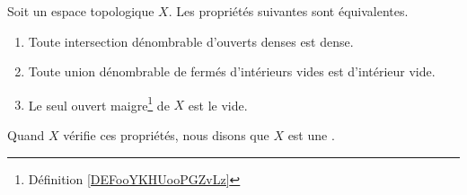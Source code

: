 \begin{propositionDef}	 \label{DEFooYEMNooLSXLYa}
	Soit un espace topologique \( X\). Les propriétés suivantes sont équivalentes.
	\begin{enumerate}
		\item		\label{ITEMooBHOOooKyToBw}
		      Toute intersection dénombrable d'ouverts denses est dense.
		\item		\label{ITEMooFMDAooUPaULP}
		      Toute union dénombrable de fermés d'intérieurs vides est d'intérieur vide.
		\item		\label{ITEMooKSNYooIgzLey}
		      Le seul ouvert maigre\footnote{Définition \ref{DEFooYKHUooPGZvLz}} de \( X\) est le vide.
	\end{enumerate}
	Quand \( X\) vérifie ces propriétés, nous disons que \( X\) est une .
\end{propositionDef}

